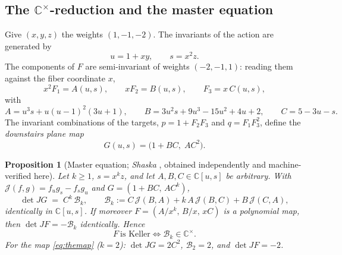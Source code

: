 \documentclass[11pt]{amsart}
\newcommand{\CC}{\mathbb{C}}
\newcommand{\Cstar}{\CC^{\times}}
\newcommand{\Jb}{\mathcal{J}}
\newcommand{\brk}{\mathcal{B}}
\theoremstyle{plain}
\newtheorem{proposition}[theorem]{Proposition}
\theoremstyle{definition}
\theoremstyle{remark}
\begin{document}
\subsection{The $\Cstar$-reduction and the master equation}
\label{ssec:reduction}
Give $(x,y,z)$ the weights $(1,-1,-2)$. The invariants of the action are
generated by
\[
u=1+xy,\qquad s=x^{2}z .
\]
The components of $F$ are semi-invariant of weights $(-2,-1,1)$:
reading them against the fiber coordinate $x$,
\begin{equation}\label{eq:collapse}
x^{2}F_{1}=A(u,s),\qquad xF_{2}=B(u,s),\qquad F_{3}=x\,C(u,s),
\end{equation}
with
\begin{equation}\label{eq:ABC}
A=u^{3}s+u(u-1)^{2}(3u+1),\qquad
B=3u^{2}s+9u^{3}-15u^{2}+4u+2,\qquad
C=5-3u-s .
\end{equation}
The invariant combinations of the targets, $p=1+F_{2}F_{3}$ and
$q=F_{1}F_{3}^{2}$, define the \emph{downstairs plane map}
\begin{equation}\label{eq:G}
G(u,s)=\bigl(1+BC,\;AC^{2}\bigr).
\end{equation}

\begin{proposition}[Master equation; \emph{Shaska
}, obtained independently and
machine-verified here]\label{prop:master}
Let $k\ge1$, $s=x^{k}z$, and let $A,B,C\in\CC[u,s]$ be arbitrary. With
$\Jb(f,g)=f_{u}g_{s}-f_{s}g_{u}$ and $G=(1+BC,\,AC^{k})$,
\begin{equation}\label{eq:master}
\det JG \;=\; C^{k}\,\brk_{k},\qquad
\brk_{k}:=C\,\Jb(B,A)+k\,A\,\Jb(B,C)+B\,\Jb(C,A),
\end{equation}
identically in $\CC[u,s]$. If moreover $F=(A/x^{k},\,B/x,\,xC)$ is a
polynomial map, then $\det JF=-\brk_{k}$ identically. Hence
\[
F\ \text{is Keller}\iff\brk_{k}\in\Cstar .
\]
For the map \eqref{eq:themap} ($k=2$): $\det JG=2C^{2}$, $\brk_{2}=2$, and
$\det JF=-2$.
\end{proposition}
\end{document}
